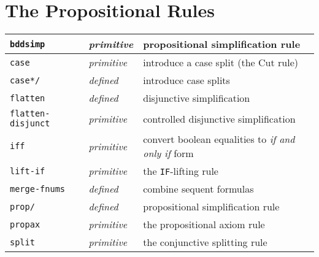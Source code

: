 \documentclass[12pt,twoside]{book}
\makeatletter
\newcommand{\indtt}[1]{\texttt{#1}\index{#1@{\texttt{#1}}}}  %
\newcommand{\indttdol}[1]{\texttt{#1/\char36}\index{#1@{\texttt{#1}}}} %
\makeatother
\begin{document}
\section{The Propositional Rules}

\begin{tabularx}{\textwidth}{|l|l|X|}\hline
\indtt{bddsimp} & \emph{primitive} & propositional simplification rule\\\hline
\indtt{case} & \emph{primitive} & introduce a case split (the Cut rule)\\\hline
\indttdol{case*} & \emph{defined} & introduce case splits \\\hline
\indtt{flatten} & \emph{defined} & disjunctive simplification\\\hline
\indtt{flatten-disjunct} & \emph{primitive} & controlled disjunctive simplification\\\hline
\indtt{iff} & \emph{primitive} & convert boolean equalities to \emph{if and only if} form\\\hline
\indtt{lift-if} & \emph{primitive} & the \texttt{IF}-lifting rule \\\hline
\indtt{merge-fnums} & \emph{defined} & combine sequent formulas\\\hline
\indttdol{prop} & \emph{defined} & propositional simplification rule \\\hline
\indtt{propax} & \emph{primitive} & the propositional axiom rule\\\hline
\indtt{split} & \emph{primitive} & the conjunctive splitting rule\\\hline
\end{tabularx}
\end{document}
